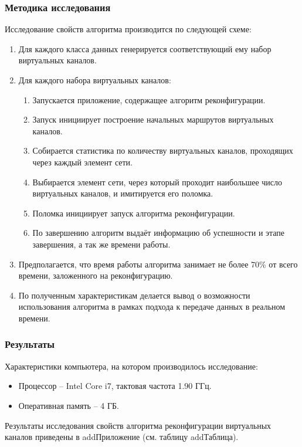 \documentclass[12pt, a4paper]{article}
\begin{document}
\subsubsection{Методика исследования}
Исследование свойств алгоритма производится по следующей схеме:
\begin{enumerate}
	\item Для каждого класса данных генерируется соответствующий ему набор виртуальных каналов.
	\item Для каждого набора виртуальных каналов:
	\begin{enumerate}
		\item Запускается приложение, содержащее алгоритм реконфигурации.
		\item Запуск инициирует построение начальных маршрутов виртуальных каналов.
		\item Собирается статистика по количеству виртуальных каналов, проходящих через каждый элемент сети.
		\item Выбирается элемент сети, через который проходит наибольшее число виртуальных каналов, и имитируется его поломка.
		\item Поломка инициирует запуск алгоритма реконфигурации.
		\item По завершению алгоритм выдаёт информацию об успешности и этапе завершения, а так же времени работы.
	\end{enumerate}
	\item Предполагается, что время работы алгоритма занимает не более 70\% от всего времени, заложенного на реконфигурацию.
	\item По полученным характеристикам делается вывод о возможности использования алгоритма в рамках подхода к передаче данных в реальном времени.
\end{enumerate}
 
\subsubsection{Результаты}
Характеристики компьютера, на котором производилось исследование:
\begin{itemize}
	\item Процессор -- Intel Core i7, тактовая частота 1.90 ГГц.
	\item Оперативная память -- 4 ГБ.
\end{itemize}

Результаты исследования свойств алгоритма реконфигурации виртуальных каналов приведены в addПриложение (см. таблицу addТаблица).
\end{document}
